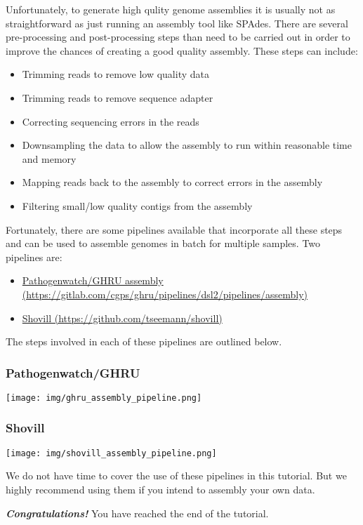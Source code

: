 \documentclass[11pt]{article}
\providecommand{\tightlist}{%
      \setlength{\itemsep}{0pt}\setlength{\parskip}{0pt}}
\begin{document}
Unfortunately, to generate high qulity genome assemblies it is usually
not as straightforward as just running an assembly tool like SPAdes.
There are several pre-processing and post-processing steps than need to
be carried out in order to improve the chances of creating a good
quality assembly. These steps can include:

\begin{itemize}
\tightlist
\item
  Trimming reads to remove low quality data
\item
  Trimming reads to remove sequence adapter
\item
  Correcting sequencing errors in the reads
\item
  Downsampling the data to allow the assembly to run within reasonable
  time and memory
\item
  Mapping reads back to the assembly to correct errors in the assembly
\item
  Filtering small/low quality contigs from the assembly
\end{itemize}

    Fortunately, there are some pipelines available that incorporate all
these steps and can be used to assemble genomes in batch for multiple
samples. Two pipelines are:

\begin{itemize}
\tightlist
\item
  \href{https://gitlab.com/cgps/ghru/pipelines/dsl2/pipelines/assembly}{Pathogenwatch/GHRU
  assembly
  (https://gitlab.com/cgps/ghru/pipelines/dsl2/pipelines/assembly)}
\item
  \href{https://github.com/tseemann/shovill}{Shovill
  (https://github.com/tseemann/shovill)}
\end{itemize}

The steps involved in each of these pipelines are outlined below.

    \hypertarget{pathogenwatchghru}{%
\subsubsection{Pathogenwatch/GHRU}\label{pathogenwatchghru}}


\begin{center}
\texttt{[image: img/ghru\_assembly\_pipeline.png]}
\end{center}


    \hypertarget{shovill}{%
\subsubsection{Shovill}\label{shovill}}


\begin{center}
\texttt{[image: img/shovill\_assembly\_pipeline.png]}
\end{center}


    We do not have time to cover the use of these pipelines in this
tutorial. But we highly recommend using them if you intend to assembly
your own data.

    \textbf{\textit{Congratulations!}} You have reached the end of the
tutorial.


\end{document}
